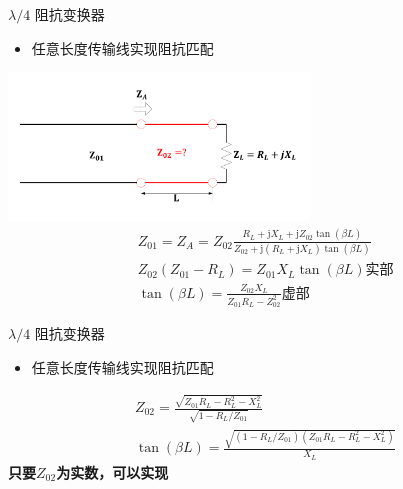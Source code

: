 \begin{frame}{$\lambda/4$ 阻抗变换器}
  \begin{itemize}
    \item 任意长度传输线实现阻抗匹配
  \end{itemize}
  \centering
  \includegraphics[width=8cm]{fig4-31.pdf}
  \begin{align*}
     & Z_{01}=Z_A=Z_{02}\frac{R_L+\mathrm{j}X_L+\mathrm{j}Z_{02}\tan(\beta L)}{Z_{02}+\mathrm{j}(R_L+\mathrm{j}X_L)\tan(\beta L)} \\
     & Z_{02}(Z_{01}-R_L)=Z_{01}X_L\tan(\beta L) \text{实部}\\
     & \tan(\beta L)=\frac{Z_{02}X_L}{Z_{01}R_L-Z_{02}^2} \text{虚部}
  \end{align*}
\end{frame}

\begin{frame}{$\lambda/4$ 阻抗变换器}
  \begin{itemize}
    \item 任意长度传输线实现阻抗匹配
  \end{itemize}
   \begin{align*}
     & Z_{02}=\frac{\sqrt{Z_{01}R_L-R_L^2-X_L^2}}{\sqrt{1-R_L/Z_{01}}}\\
     & \tan(\beta L)=\frac{\sqrt{(1-R_L/Z_{01})(Z_{01}R_L-R_L^2-X_L^2)}}{X_L} 
  \end{align*}
  \textbf{只要$Z_{02}$为实数，可以实现}
\end{frame}

